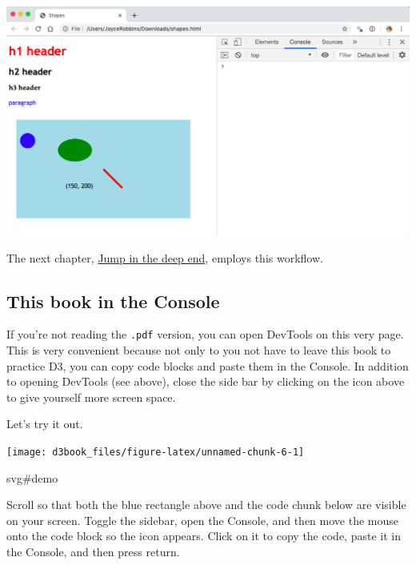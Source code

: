 \documentclass[openany]{book}
\begin{document}
\begin{center}\includegraphics[width=14.79in]{images/console} \end{center}

The next chapter, \href{jump.html}{Jump in the deep end}, employs this workflow.

\hypertarget{this-book-in-the-console}{%
\subsection{This book in the Console}\label{this-book-in-the-console}}

If you're not reading the \texttt{.pdf} version, you can open DevTools on this very page. This is very convenient because not only to you not have to leave this book to practice D3, you can copy code blocks and paste them in the Console. In addition to opening DevTools (see above), close the side bar by clicking on the icon above to give yourself more screen space.

Let's try it out.

\begin{center}\texttt{[image: d3book\_files/figure-latex/unnamed-chunk-6-1]} \end{center}

svg\#demo

Scroll so that both the blue rectangle above and the code chunk below are visible on your screen. Toggle the sidebar, open the Console, and then move the mouse onto the code block so the icon appears. Click on it to copy the code, paste it in the Console, and then press return.
\end{document}
